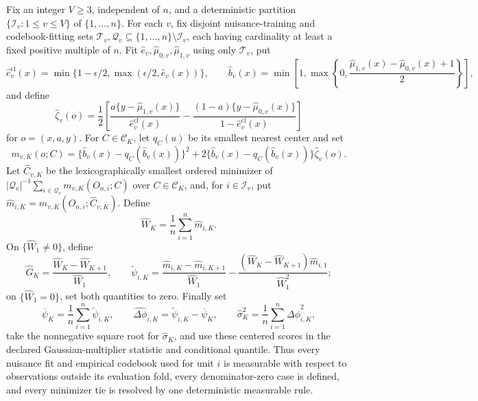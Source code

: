 Fix an integer \(V\geq3\), independent of \(n\), and a deterministic partition \(\{\mathcal I_v:1\leq v\leq V\}\) of \(\{1,\ldots,n\}\).  For each \(v\), fix disjoint nuisance-training and codebook-fitting sets \(\mathcal T_v,\mathcal Q_v\subseteq\{1,\ldots,n\}\setminus\mathcal I_v\), each having cardinality at least a fixed positive multiple of \(n\).  Fit \(\widehat e_v,\widehat\mu_{0,v},\widehat\mu_{1,v}\) using only \(\mathcal T_v\), put
\[
 \widehat e_v^{\mathrm{cl}}(x)=\min\{1-\epsilon/2,\max(\epsilon/2,\widehat e_v(x))\},
 \qquad
 \widehat b_v(x)=\min\!\left[1,\max\!\left\{0,
 \frac{\widehat\mu_{1,v}(x)-\widehat\mu_{0,v}(x)+1}{2}\right\}\right],
\]
and define
\[
 \widehat\zeta_v(o)=\frac12\left[
 \frac{a\{y-\widehat\mu_{1,v}(x)\}}{\widehat e_v^{\mathrm{cl}}(x)}
 -\frac{(1-a)\{y-\widehat\mu_{0,v}(x)\}}{1-\widehat e_v^{\mathrm{cl}}(x)}\right]
\]
for \(o=(x,a,y)\).  For \(C\in\mathcal C_K\), let \(q_C(u)\) be its smallest nearest center and set
\[
 m_{v,K}(o;C)=\{\widehat b_v(x)-q_C(\widehat b_v(x))\}^2
 +2\{\widehat b_v(x)-q_C(\widehat b_v(x))\}\widehat\zeta_v(o).
\]
Let \(\widehat C_{v,K}\) be the lexicographically smallest ordered minimizer of \(|\mathcal Q_v|^{-1}\sum_{i\in\mathcal Q_v}m_{v,K}(O_{n,i};C)\) over \(C\in\mathcal C_K\), and, for \(i\in\mathcal I_v\), put \(\widehat m_{i,K}=m_{v,K}(O_{n,i};\widehat C_{v,K})\).  Define
\[
 \widehat W_K=\frac1n\sum_{i=1}^n\widehat m_{i,K}.
\]
On \(\{\widehat W_1\neq0\}\), define
\[
 \widehat G_K=\frac{\widehat W_K-\widehat W_{K+1}}{\widehat W_1},
 \qquad
 \widetilde\psi_{i,K}=
 \frac{\widehat m_{i,K}-\widehat m_{i,K+1}}{\widehat W_1}
 -\frac{(\widehat W_K-\widehat W_{K+1})\widehat m_{i,1}}{\widehat W_1^2};
\]
on \(\{\widehat W_1=0\}\), set both quantities to zero.  Finally set
\[
 \overline\psi_K=\frac1n\sum_{i=1}^n\widetilde\psi_{i,K},\qquad
 \widehat{\Delta\phi}_{i,K}=\widetilde\psi_{i,K}-\overline\psi_K,
 \qquad
 \widehat\sigma_K^2=\frac1n\sum_{i=1}^n\widehat{\Delta\phi}_{i,K}^2,
\]
take the nonnegative square root for \(\widehat\sigma_K\), and use these centered scores in the declared Gaussian-multiplier statistic and conditional quantile.  Thus every nuisance fit and empirical codebook used for unit \(i\) is measurable with respect to observations outside its evaluation fold, every denominator-zero case is defined, and every minimizer tie is resolved by one deterministic measurable rule.